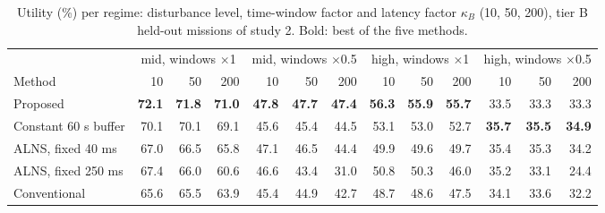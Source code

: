\begin{table}[t]
\caption{Utility (\%) per regime: disturbance level, time-window factor and latency factor $\kappa_B$ (10, 50, 200), tier B held-out missions of study 2. Bold: best of the five methods.}\label{tab:s2regime}
\centering\footnotesize
\setlength{\tabcolsep}{2.2pt}
\begin{tabular}{lrrrrrrrrrrrr}
\toprule
 & \multicolumn{3}{c}{mid, windows $\times$1} & \multicolumn{3}{c}{mid, windows $\times$0.5} & \multicolumn{3}{c}{high, windows $\times$1} & \multicolumn{3}{c}{high, windows $\times$0.5} \\
\cmidrule(lr){2-4}\cmidrule(lr){5-7}\cmidrule(lr){8-10}\cmidrule(lr){11-13}
Method & 10 & 50 & 200 & 10 & 50 & 200 & 10 & 50 & 200 & 10 & 50 & 200 \\
\midrule
Proposed & \textbf{72.1} & \textbf{71.8} & \textbf{71.0} & \textbf{47.8} & \textbf{47.7} & \textbf{47.4} & \textbf{56.3} & \textbf{55.9} & \textbf{55.7} & 33.5 & 33.3 & 33.3 \\
Constant 60 s buffer & 70.1 & 70.1 & 69.1 & 45.6 & 45.4 & 44.5 & 53.1 & 53.0 & 52.7 & \textbf{35.7} & \textbf{35.5} & \textbf{34.9} \\
ALNS, fixed 40 ms & 67.0 & 66.5 & 65.8 & 47.1 & 46.5 & 44.4 & 49.9 & 49.6 & 49.7 & 35.4 & 35.3 & 34.2 \\
ALNS, fixed 250 ms & 67.4 & 66.0 & 60.6 & 46.6 & 43.4 & 31.0 & 50.8 & 50.3 & 46.0 & 35.2 & 33.1 & 24.4 \\
Conventional & 65.6 & 65.5 & 63.9 & 45.4 & 44.9 & 42.7 & 48.7 & 48.6 & 47.5 & 34.1 & 33.6 & 32.2 \\
\bottomrule
\end{tabular}
\end{table}
